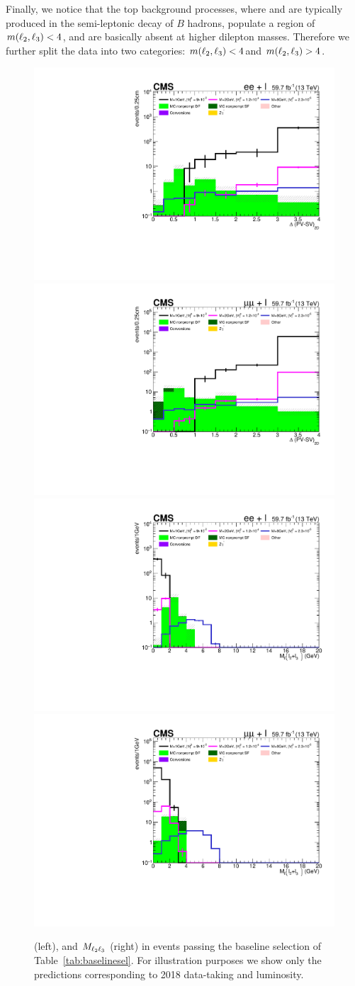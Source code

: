 Finally, we notice that the top background processes, where \ltwo and
\lthree are typically produced in the semi-leptonic decay of $B$
hadrons, populate a region of $m(\ell_2,\ell_3)<4$\GeV, and are basically absent
at higher dilepton masses. Therefore we further split the data into
two categories: $m(\ell_2,\ell_3)<4$\GeV and $m(\ell_2,\ell_3)>4$\GeV.\\
 
 \begin{figure}
  \centering
  \includegraphics[clip,trim=0.9cm 0.7cm 0.7cm 0.9cm,width=.3\textwidth]{Figures/c6/selection/18/e_DeltaPV_SV_2D_zomm__final.pdf}
  \includegraphics[clip,trim=0.9cm 0.7cm 0.7cm 0.9cm,width=.3\textwidth]{Figures/c6/selection/18/mu_DeltaPV_SV_2D_zomm__final.pdf}\\
  \includegraphics[clip,trim=0.9cm 0.7cm 0.7cm 0.9cm,width=.3\textwidth]{Figures/c6/selection/18/e_M_ll_l2_l3_zoom__final.pdf}
  \includegraphics[clip,trim=0.9cm 0.7cm 0.7cm 0.9cm,width=.3\textwidth]{Figures/c6/selection/18/mu_M_ll_l2_l3_zoom__final.pdf}
  \caption{\Deltwod (left), and $M_{\ell_2 \ell_3}$ (right) in events
    passing the baseline selection of Table~\ref{tab:baselinesel}. For illustration purposes we show
    only the predictions corresponding to 2018 data-taking and luminosity.}
  \label{fig:reco_displ}
\end{figure}


